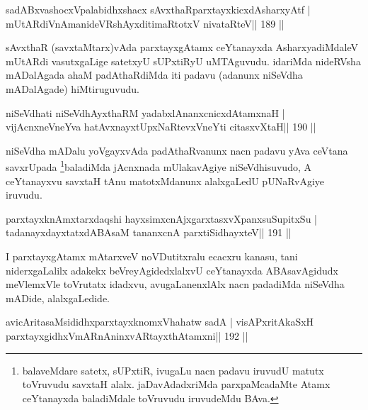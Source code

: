 
\begin{shl}
sadABxvashocxVpalabidhxshacx sAvxthaRparxtayxkicxdAsharxyAtf |
mUtARdiVnAmanideVRshAyxditimaRtotxV nivataRteV\hfill || 189 ||
\end{shl}

\begin{artha}
sAvxthaR (savxtaMtarx)vAda parxtayxgAtamx ceYtanayxda AsharxyadiMdaleV mUtARdi vasutxgaLige satetxyU sUPxtiRyU uMTAguvudu. idariMda nideRVsha mADalAgada ahaM padAthaRdiMda iti padavu (adanunx niSeVdha mADalAgade) hiMtiruguvudu.
\end{artha}

\begin{shl}
niSeVdhati niSeVdhAyxthaRM yadabxlAnanxcnicxdAtamxnaH |
vijAcnxneVneYva hatAvx\s nayxtUpxNaRtevxVneYti citasxvXtaH\hfill || 190 ||
\end{shl}

\begin{artha}
niSeVdha mADalu yoVgayxvAda padAthaRvanunx nacn padavu yAva ceVtana savxrUpada  \footnote{balaveMdare satetx, sUPxtiR, ivugaLu nacn   padavu iruvudU matutx toVruvudu savxtaH alalx. jaDavAdadxriMda   parxpaMcadaMte Atamx ceYtanayxda baladiMdale toVruvudu iruvudeMdu BAva.}baladiMda jAcnxnada mUlakavAgiye niSeVdhisuvudo, A ceYtanayxvu savxtaH tAnu matotxMdanunx alalxgaLedU pUNaRvAgiye iruvudu.
\end{artha}


\begin{shl}
parxtayxknAmxtarxdaqshi hayxsimxcnAjxgarxtasxvXpanxsuSupitxSu |
tadanayxdayxtatxdABAsaM tananxcnA parxtiSidhayxteV\hfill || 191 ||
\end{shl}

\begin{artha}
I parxtayxgAtamx mAtarxveV noVDutitxralu ecacxru kanasu, tani niderxgaLalilx adakekx beVreyAgidedxlalxvU ceYtanayxda ABAsavAgidudx meVlemxVle toVrutatx idadxvu, avugaLanenxlAlx nacn padadiMda niSeVdha mADide, alalxgaLedide.
\end{artha}

\begin{shl}
avicAritasaMsididhxparxtayxknomxVhahatw sadA |
visAPxritAkaSxH parxtayxgidhxVmARnAninxvARtayxthA\s\s tamxni\hfill || 192 ||
\end{shl}

